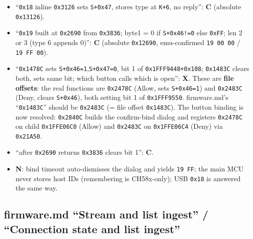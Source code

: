 \begin{itemize}
\tightlist
\item
  ``\texttt{0x18} inline \texttt{0x3126} sets \texttt{S+0x47}, stores
  type at \texttt{K+6}, no reply'': \textbf{C} (absolute
  \texttt{0x13126}).
\item
  ``\texttt{0x19} built at \texttt{0x2690} from \texttt{0x3836}; byte1 =
  0 if \texttt{S+0x46!=0} else \texttt{0xFF}; len 2 or 3 (type 6 appends
  0)'': \textbf{C} (absolute \texttt{0x12690}, emu-confirmed
  \texttt{19\ 00\ 00} / \texttt{19\ FF\ 00}).
\item
  ``\texttt{0x1478C} sets \texttt{S+0x46=1},\texttt{S+0x47=0}, bit 1 of
  \texttt{0x1FFF9448+0x108}; \texttt{0x1483C} clears both, sets same
  bit; which button calls which is open'': \textbf{X}. These are
  \textbf{file offsets}: the real functions are \texttt{0x2478C} (Allow,
  sets \texttt{S+0x46=1}) and \texttt{0x2483C} (Deny, clears
  \texttt{S+0x46}), both setting bit 1 of \texttt{0x1FFF9550}.
  firmware.md's ``\texttt{0x1483C}'' should be \texttt{0x2483C} (= file
  offset \texttt{0x1483C}). The button binding is now resolved:
  \texttt{0x2840C} builds the confirm-bind dialog and registers
  \texttt{0x2478C} on child \texttt{0x1FFE06C0} (Allow) and
  \texttt{0x2483C} on \texttt{0x1FFE06C4} (Deny) via \texttt{0x21A50}.
\item
  ``after \texttt{0x2690} returns \texttt{0x3836} clears bit 1'':
  \textbf{C}.
\item
  \textbf{N}: bind timeout auto-dismisses the dialog and yields
  \texttt{19\ FF}; the main MCU never stores host IDs (remembering is
  CH58x-only); USB \texttt{0x18} is answered the same way.
\end{itemize}

\subsection{firmware.md ``Stream and list ingest'' / ``Connection state
and list
ingest''}\label{firmware.md-stream-and-list-ingest-connection-state-and-list-ingest}

